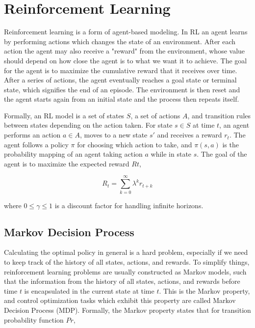 \documentclass[11pt, oneside]{article}   	%
\begin{document}
\section{Reinforcement Learning}

Reinforcement learning is a form of agent-based modeling. In RL an agent learns by performing actions which changes the state of an environment. After each action the agent may also receive a "reward" from the environment, whose value should depend on how close the agent is to what we want it to achieve. The goal for the agent is to maximize the cumulative reward that it receives over time. After a series of actions, the agent eventually reaches a goal state or terminal state, which signifies the end of an episode. The environment is then reset and the agent starts again from an initial state and the process then repeats itself.

\hfill

Formally, an RL model is a set of states $S$, a set of actions $A$, and transition rules between states depending on the action taken. For state $s \in S$ at time $t$, an agent performs an action $a \in A$, moves to a new state $s'$ and receives a reward $r_t$.  The agent follows a policy $\pi$ for choosing which action to take, and $\pi(s,a)$ is the probability mapping of an agent taking action $a$ while in state $s$. The goal of the agent is to maximize the expected reward $Rt$,

\begin{equation}
R_t = \sum_{k=0}^{\infty}\lambda^kr_{t+k}
\end{equation}

where $0 \leq \gamma \leq 1$ is a discount factor for handling infinite horizons.


\subsection{Markov Decision Process}

Calculating the optimal policy in general is a hard problem, especially if we need to keep track of the history of all states, actions, and rewards. To simplify things, reinforcement learning problems are usually constructed as Markov models, such that the information from the history of all states, actions, and rewards before time $t$ is encapsulated in the current state at time $t$. This is the Markov property, and control optimization tasks which exhibit this property are called Markov Decision Process (MDP). Formally, the Markov property states that for transition probability function $Pr$,
\end{document}
